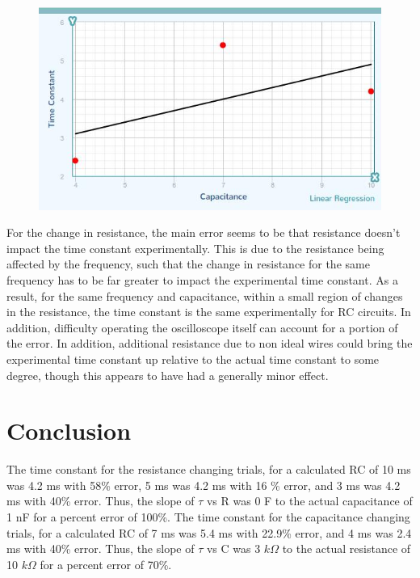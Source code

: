 \documentclass[11pt, titlepage]{article}
\begin{document}
\begin{figure}[h]
\centering
\hspace*{0cm}
\includegraphics[scale=0.8]{graph52.jpg}
\vspace*{0cm}
\end{figure}

For the change in resistance, the main error seems to be that resistance doesn't impact the time constant experimentally. This is due to the resistance being affected by the frequency, such that the change in resistance for the same frequency has to be far greater to impact the experimental time constant. As a result, for the same frequency and capacitance, within a small region of changes in the resistance, the time constant is the same experimentally for RC circuits. In addition, difficulty operating the oscilloscope itself can account for a portion of the error. In addition, additional resistance due to non ideal wires could bring the experimental time constant up relative to the actual time constant to some degree, though this appears to have had a generally minor effect. 

\section*{Conclusion}

The time constant for the resistance changing trials, for a calculated RC of 10 ms was 4.2 ms with 58\% error, 5 ms was 4.2 ms with 16 \% error, and 3 ms was 4.2 ms with 40\% error. Thus, the slope of $\tau$ vs R was 0 F to the actual capacitance of 1 nF for a percent error of 100\%. The time constant for the capacitance changing trials, for a calculated RC of 7 ms was 5.4 ms with 22.9\% error, and 4 ms was 2.4 ms with 40\% error. Thus, the slope of $\tau$ vs C was 3 $k\Omega$ to the actual resistance of 10 $k\Omega$ for a percent error of 70\%.
\end{document}

